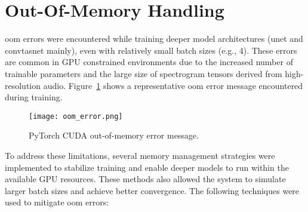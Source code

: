 \section{Out-Of-Memory Handling}
\label{sec:oom_handling}

\gls{oom} errors were encountered while training deeper model architectures (\gls{unet} and \gls{convtasnet} mainly), even with relatively small batch sizes (e.g., 4). These errors are common in GPU constrained environments due to the increased number of trainable parameters and the large size of spectrogram tensors derived from high-resolution audio. Figure~\ref{fig:oom_error} shows a representative \gls{oom} error message encountered during training.

\begin{figure}[H]
    \centering
    \texttt{[image: oom\_error.png]}
    \caption{\label{fig:oom_error} PyTorch CUDA out-of-memory error message.}
\end{figure}

To address these limitations, several memory management strategies were implemented to stabilize training and enable deeper models to run within the available GPU resources. These methods also allowed the system to simulate larger batch sizes and achieve better convergence. The following techniques were used to mitigate \gls{oom} errors:

